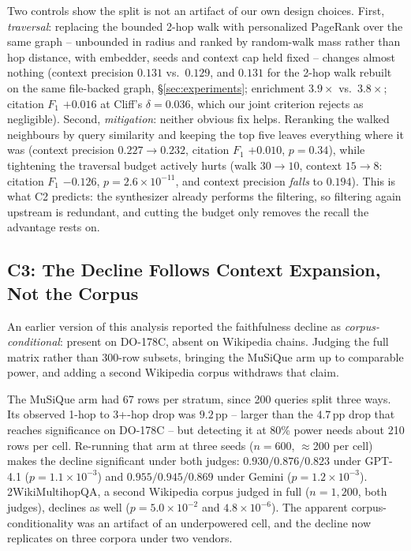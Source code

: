 Two controls show the split is not an artifact of our own design
choices. First, \emph{traversal}: replacing the bounded 2-hop walk with
personalized PageRank over the same graph -- unbounded in radius and
ranked by random-walk mass rather than hop distance, with embedder,
seeds and context cap held fixed -- changes almost nothing (context
precision $0.131$ vs.\ $0.129$, and $0.131$ for the 2-hop walk rebuilt
on the same file-backed graph, \S\ref{sec:experiments}; enrichment $3.9\times$ vs.\
$3.8\times$; citation $F_1$ $+0.016$ at Cliff's $\delta{=}0.036$, which
our joint criterion rejects as negligible). Second, \emph{mitigation}:
neither obvious fix helps. Reranking the walked neighbours by query
similarity and keeping the top five leaves everything where it was
(context precision $0.227{\to}0.232$, citation $F_1$ $+0.010$,
$p{=}0.34$), while tightening the traversal budget actively hurts
(walk $30{\to}10$, context $15{\to}8$: citation $F_1$ $-0.126$,
$p{=}2.6{\times}10^{-11}$, and context precision \emph{falls} to
$0.194$). This is what C2 predicts: the synthesizer already performs
the filtering, so filtering again upstream is redundant, and cutting
the budget only removes the recall the advantage rests on.

\subsection{C3: The Decline Follows Context Expansion, Not the Corpus}
\label{sec:c3}
An earlier version of this analysis reported the faithfulness decline as
\emph{corpus-conditional}: present on DO-178C, absent on Wikipedia
chains. Judging the full matrix rather than 300-row subsets, bringing
the MuSiQue arm up to comparable power, and adding a second Wikipedia
corpus withdraws that claim.

The MuSiQue arm had 67 rows per stratum, since 200 queries split three
ways. Its observed 1-hop to 3+-hop drop was $9.2$\,pp -- larger than the
$4.7$\,pp drop that reaches significance on DO-178C -- but detecting it
at 80\% power needs about 210 rows per cell. Re-running that arm at
three seeds ($n{=}600$, $\approx$200 per cell) makes the decline
significant under both judges: $0.930/0.876/0.823$ under GPT-4.1
($p{=}1.1{\times}10^{-3}$) and $0.955/0.945/0.869$ under Gemini
($p{=}1.2{\times}10^{-3}$). 2WikiMultihopQA, a second Wikipedia corpus
judged in full ($n{=}1{,}200$, both judges), declines as well
($p{=}5.0{\times}10^{-2}$ and $4.8{\times}10^{-6}$). The apparent
corpus-conditionality was an artifact of an underpowered cell, and the
decline now replicates on three corpora under two vendors.

